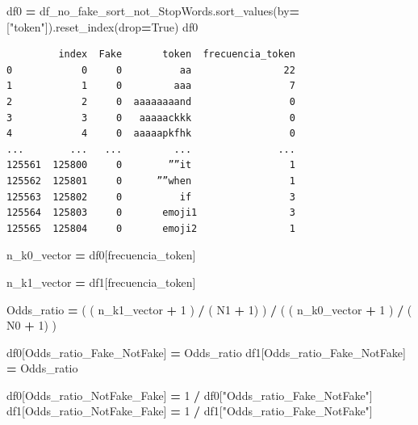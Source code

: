 \documentclass[
  11pt,
  a4paper,
]{article}
\newenvironment{Shaded}{\begin{snugshade}}{\end{snugshade}}
\newcommand{\DecValTok}[1]{\textcolor[rgb]{0.00,0.00,0.81}{#1}}
\newcommand{\NormalTok}[1]{#1}
\newcommand{\OperatorTok}[1]{\textcolor[rgb]{0.81,0.36,0.00}{\textbf{#1}}}
\newcommand{\StringTok}[1]{\textcolor[rgb]{0.31,0.60,0.02}{#1}}
\newcommand{\VariableTok}[1]{\textcolor[rgb]{0.00,0.00,0.00}{#1}}
\begin{document}
\begin{Shaded}
\begin{Highlighting}[]
\NormalTok{df0 }\OperatorTok{=}\NormalTok{ df\_no\_fake\_sort\_not\_StopWords.sort\_values(by}\OperatorTok{=}\NormalTok{[}\StringTok{"token"}\NormalTok{]).reset\_index(drop}\OperatorTok{=}\VariableTok{True}\NormalTok{)}
\NormalTok{df0}
\end{Highlighting}
\end{Shaded}

\begin{verbatim}
         index  Fake       token  frecuencia_token
0            0     0          aa                22
1            1     0         aaa                 7
2            2     0  aaaaaaaand                 0
3            3     0   aaaaackkk                 0
4            4     0  aaaaapkfhk                 0
...        ...   ...         ...               ...
125561  125800     0        ””it                 1
125562  125801     0      ””when                 1
125563  125802     0          if                 3
125564  125803     0       emoji1                3
125565  125804     0       emoji2                1
\end{verbatim}

\begin{Shaded}
\begin{Highlighting}[]

\NormalTok{n\_k0\_vector }\OperatorTok{=}\NormalTok{ df0[}\StringTok{\textquotesingle{}frecuencia\_token\textquotesingle{}}\NormalTok{]}

\NormalTok{n\_k1\_vector }\OperatorTok{=}\NormalTok{ df1[}\StringTok{\textquotesingle{}frecuencia\_token\textquotesingle{}}\NormalTok{]}


\NormalTok{Odds\_ratio }\OperatorTok{=}\NormalTok{ ( ( n\_k1\_vector }\OperatorTok{+} \DecValTok{1}\NormalTok{ ) }\OperatorTok{/}\NormalTok{ ( N1 }\OperatorTok{+} \DecValTok{1}\NormalTok{) ) }\OperatorTok{/}\NormalTok{ ( ( n\_k0\_vector }\OperatorTok{+} \DecValTok{1}\NormalTok{ ) }\OperatorTok{/}\NormalTok{ ( N0 }\OperatorTok{+} \DecValTok{1}\NormalTok{) )}
\end{Highlighting}
\end{Shaded}

\begin{Shaded}
\begin{Highlighting}[]
\NormalTok{df0[}\StringTok{\textquotesingle{}Odds\_ratio\_Fake\_NotFake\textquotesingle{}}\NormalTok{] }\OperatorTok{=}\NormalTok{ Odds\_ratio  }
\NormalTok{df1[}\StringTok{\textquotesingle{}Odds\_ratio\_Fake\_NotFake\textquotesingle{}}\NormalTok{] }\OperatorTok{=}\NormalTok{ Odds\_ratio  }

\NormalTok{df0[}\StringTok{\textquotesingle{}Odds\_ratio\_NotFake\_Fake\textquotesingle{}}\NormalTok{] }\OperatorTok{=} \DecValTok{1} \OperatorTok{/}\NormalTok{ df0[}\StringTok{"Odds\_ratio\_Fake\_NotFake"}\NormalTok{] }
\NormalTok{df1[}\StringTok{\textquotesingle{}Odds\_ratio\_NotFake\_Fake\textquotesingle{}}\NormalTok{] }\OperatorTok{=} \DecValTok{1} \OperatorTok{/}\NormalTok{ df1[}\StringTok{"Odds\_ratio\_Fake\_NotFake"}\NormalTok{]  }
\end{Highlighting}
\end{Shaded}
\end{document}
